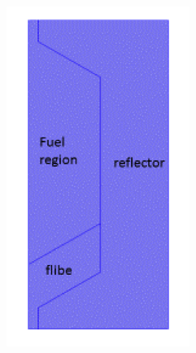 \documentclass{elsarticle}
\begin{document}
\begin{figure}[h]
  \centering
  \begin{subfigure}{0.2\textwidth}
    \includegraphics[width = \columnwidth]{./images/diffusion/tmsr/2d_schematic.png}
  \end{subfigure}
  ~
  \begin{subfigure}{0.55\textwidth}

\end{subfigure}
\end{figure}
\end{document}
